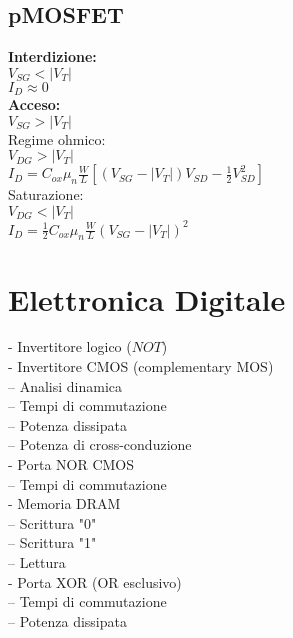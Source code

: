 \documentclass{article}
\begin{document}
\subsection*{pMOSFET}
\textbf{Interdizione:}\\
\hspace*{2cm} $V_{SG} < |V_T|$\\
\hspace*{2cm} $I_D \approx 0$\\
\textbf{Acceso:}\\
\hspace*{2cm} $V_{SG} > |V_T|$\\
\hspace*{1cm} Regime ohmico:\\
\hspace*{2cm} $V_{DG} > |V_T|$\\
\hspace*{2cm} $I_D = C_{ox} \mu_n \frac{W}{L} \left[ (V_{SG} - |V_T|)V_{SD} - \frac{1}{2}V_{SD}^2 \right]$\\
\hspace*{1cm} Saturazione:\\
\hspace*{2cm} $V_{DG} < |V_T|$\\
\hspace*{2cm} $I_D = \frac{1}{2} C_{ox} \mu_n \frac{W}{L} (V_{SG} - |V_T|)^2$

\newpage
\section*{Elettronica Digitale}
- Invertitore logico ($NOT$)\\
- Invertitore CMOS (complementary MOS)\\
-- Analisi dinamica\\
-- Tempi di commutazione\\
-- Potenza dissipata\\
-- Potenza di cross-conduzione\\
- Porta NOR CMOS\\
-- Tempi di commutazione\\
- Memoria DRAM\\
-- Scrittura "0"\\
-- Scrittura "1"\\
-- Lettura\\
- Porta XOR (OR esclusivo)\\
-- Tempi di commutazione\\
-- Potenza dissipata\\
\end{document}
